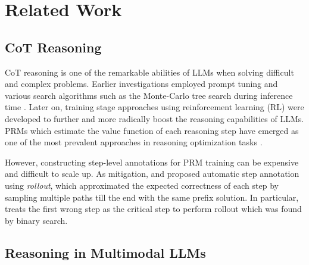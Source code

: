 \section{Related Work}
\subsection{CoT Reasoning}
CoT reasoning is one of the remarkable abilities of LLMs when solving difficult and complex problems. Earlier investigations employed prompt tuning and various search algorithms such as the Monte-Carlo tree search during inference time \cite{treesearch1,treesearch2,treesearch3,treesearch4,treesearch5}. Later on, training stage approaches using reinforcement learning (RL) were developed to further and more radically boost the reasoning capabilities of LLMs. PRMs which estimate the value function of each reasoning step have emerged as one of the most prevalent approaches in reasoning optimization tasks \cite{ormprm,prm0,prm1,llamaberry,prm2}. 

However, constructing step-level annotations for PRM training can be expensive and difficult to scale up. As mitigation, \citet{mathshepherd} and \citet{prm1} proposed automatic step annotation using \textit{rollout}, which approximated the expected correctness of each step by sampling multiple paths till the end with the same prefix solution. In particular, \citet{prm1} treats the first wrong step as the critical step to perform rollout which was found by binary search. 

\subsection{Reasoning in Multimodal LLMs}



